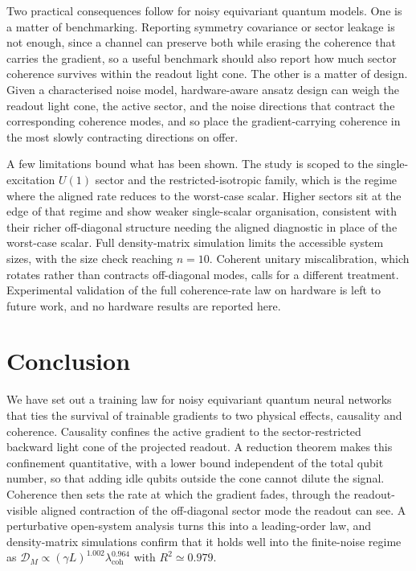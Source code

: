 \documentclass{article}
\newcommand{\DM}{\mathcal{D}_M}
\newcommand{\lcoh}{\lambda_{\mathrm{coh}}}
\begin{document}
Two practical consequences follow for noisy equivariant quantum models. One is a matter of benchmarking. Reporting symmetry covariance or sector leakage is not enough, since a channel can preserve both while erasing the coherence that carries the gradient, so a useful benchmark should also report how much sector coherence survives within the readout light cone. The other is a matter of design. Given a characterised noise model, hardware-aware ansatz design can weigh the readout light cone, the active sector, and the noise directions that contract the corresponding coherence modes, and so place the gradient-carrying coherence in the most slowly contracting directions on offer.

A few limitations bound what has been shown. The study is scoped to the single-excitation $U(1)$ sector and the restricted-isotropic family, which is the regime where the aligned rate reduces to the worst-case scalar. Higher sectors sit at the edge of that regime and show weaker single-scalar organisation, consistent with their richer off-diagonal structure needing the aligned diagnostic in place of the worst-case scalar. Full density-matrix simulation limits the accessible system sizes, with the size check reaching $n=10$. Coherent unitary miscalibration, which rotates rather than contracts off-diagonal modes, calls for a different treatment. Experimental validation of the full coherence-rate law on hardware is left to future work, and no hardware results are reported here.

\section{Conclusion}\label{sec:conclusion}

We have set out a training law for noisy equivariant quantum neural networks that ties the survival of trainable gradients to two physical effects, causality and coherence. Causality confines the active gradient to the sector-restricted backward light cone of the projected readout. A reduction theorem makes this confinement quantitative, with a lower bound independent of the total qubit number, so that adding idle qubits outside the cone cannot dilute the signal. Coherence then sets the rate at which the gradient fades, through the readout-visible aligned contraction of the off-diagonal sector mode the readout can see. A perturbative open-system analysis turns this into a leading-order law, and density-matrix simulations confirm that it holds well into the finite-noise regime as $\DM\propto(\gamma L)^{1.002}\lcoh^{0.964}$ with $R^2\simeq0.979$.
\end{document}
